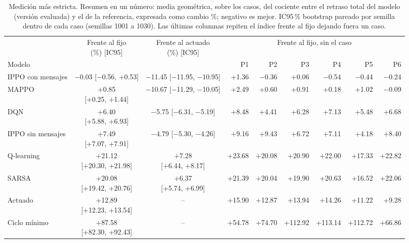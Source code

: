 \begin{table}[!tbp]
\centering
\scriptsize
\setlength{\tabcolsep}{3pt}
\begin{tabular}{lccrrrrrr}
\toprule
 & \makecell{Frente al fijo\\(\%) [IC95]} & \makecell{Frente al actuado\\(\%) [IC95]} & \multicolumn{6}{c}{Frente al fijo, sin el caso} \\
\cmidrule(lr){4-9}
Modelo & & & P1 & P2 & P3 & P4 & P5 & P6 \\
\midrule
IPPO con mensajes & \makecell[c]{$-$0.03\\{}[$-$0.56, +0.53]} & \makecell[c]{$-$11.45\\{}[$-$11.95, $-$10.95]} & +1.36 & $-$0.36 & +0.06 & $-$0.54 & $-$0.44 & $-$0.24 \\
MAPPO & \makecell[c]{+0.85\\{}[+0.25, +1.44]} & \makecell[c]{$-$10.67\\{}[$-$11.29, $-$10.05]} & +2.49 & +0.60 & +0.91 & +0.18 & +1.02 & $-$0.09 \\
DQN & \makecell[c]{+6.40\\{}[+5.88, +6.93]} & \makecell[c]{$-$5.75\\{}[$-$6.31, $-$5.19]} & +8.48 & +4.41 & +6.28 & +7.13 & +5.48 & +6.68 \\
IPPO sin mensajes & \makecell[c]{+7.49\\{}[+7.07, +7.91]} & \makecell[c]{$-$4.79\\{}[$-$5.30, $-$4.26]} & +9.16 & +9.43 & +6.72 & +7.11 & +4.18 & +8.40 \\
Q-learning & \makecell[c]{+21.12\\{}[+20.30, +21.98]} & \makecell[c]{+7.28\\{}[+6.44, +8.17]} & +23.68 & +20.08 & +20.90 & +22.00 & +17.33 & +22.82 \\
SARSA & \makecell[c]{+20.08\\{}[+19.42, +20.76]} & \makecell[c]{+6.37\\{}[+5.74, +6.99]} & +21.39 & +20.04 & +19.90 & +20.63 & +16.52 & +22.06 \\
Actuado & \makecell[c]{+12.89\\{}[+12.23, +13.54]} & -- & +15.90 & +12.87 & +13.94 & +14.26 & +11.22 & +9.28 \\
Ciclo mínimo & \makecell[c]{+87.58\\{}[+82.30, +92.43]} & -- & +54.78 & +74.70 & +112.92 & +113.14 & +112.72 & +66.86 \\
\bottomrule
\end{tabular}
\caption[Medición más estricta: resumen en un número]{Medición más estricta. Resumen en un número: media geométrica, sobre los casos, del cociente entre el retraso total del modelo (versión evaluada) y el de la referencia, expresada como cambio \%; negativo es mejor. IC95\,\% bootstrap pareado por semilla dentro de cada caso (semillas 1001 a 1030). Las últimas columnas repiten el índice frente al fijo dejando fuera un caso.}
\label{tab:robustez-numero-unico}
\end{table}

